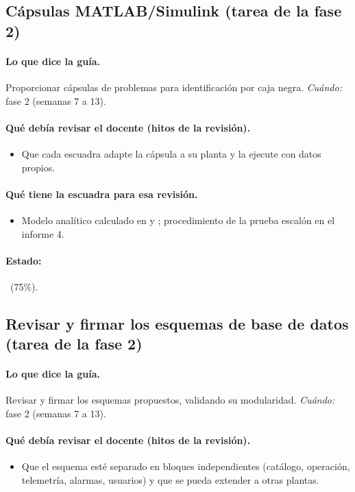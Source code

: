 \documentclass[a4paper,11pt]{article}
\begin{document}
\subsection{Cápsulas MATLAB/Simulink (tarea de la fase 2)}
\paragraph{Lo que dice la guía.} Proporcionar cápsulas de problemas para identificación por caja negra. \textit{Cuándo:} fase 2 (semanas 7 a 13).
\paragraph{Qué debía revisar el docente (hitos de la revisión).}
\begin{itemize}
\item[$\square$] Que cada escuadra adapte la cápsula a su planta y la ejecute con datos propios.
\end{itemize}
\paragraph{Qué tiene la escuadra para esa revisión.}
\begin{itemize}
\item Modelo analítico calculado en  y ; procedimiento de la prueba escalón en el informe 4.
\end{itemize}
\paragraph{Estado:} \parcial~(75\%).
\subsection{Revisar y firmar los esquemas de base de datos (tarea de la fase 2)}
\paragraph{Lo que dice la guía.} Revisar y firmar los esquemas propuestos, validando su modularidad. \textit{Cuándo:} fase 2 (semanas 7 a 13).
\paragraph{Qué debía revisar el docente (hitos de la revisión).}
\begin{itemize}
\item[$\square$] Que el esquema esté separado en bloques independientes (catálogo, operación, telemetría, alarmas, usuarios) y que se pueda extender a otras plantas.
\end{itemize}
\end{document}
